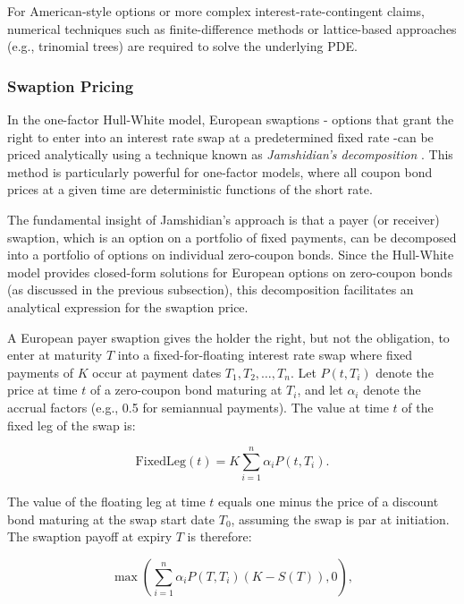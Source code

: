 For American-style options or more complex interest-rate-contingent claims, numerical techniques such as finite-difference methods or lattice-based approaches (e.g., trinomial trees) are required to solve the underlying PDE.

\subsubsection{Swaption Pricing} \label{swaption_pricing}
In the one-factor Hull-White model, European swaptions - options that grant the right to enter into an interest rate swap at a predetermined fixed rate -can be priced analytically using a technique known as \textit{Jamshidian’s decomposition} \parencite{jamshidian1989decomposition}. This method is particularly powerful for one-factor models, where all coupon bond prices at a given time are deterministic functions of the short rate.

The fundamental insight of Jamshidian’s approach is that a payer (or receiver) swaption, which is an option on a portfolio of fixed payments, can be decomposed into a portfolio of options on individual zero-coupon bonds. Since the Hull-White model provides closed-form solutions for European options on zero-coupon bonds (as discussed in the previous subsection), this decomposition facilitates an analytical expression for the swaption price.

A European payer swaption gives the holder the right, but not the obligation, to enter at maturity \( T \) into a fixed-for-floating interest rate swap where fixed payments of \( K \) occur at payment dates \( T_1, T_2, \dots, T_n \). Let \( P(t, T_i) \) denote the price at time \( t \) of a zero-coupon bond maturing at \( T_i \), and let \( \alpha_i \) denote the accrual factors (e.g., 0.5 for semiannual payments). The value at time \( t \) of the fixed leg of the swap is:

\begin{equation}
\text{FixedLeg}(t) = K \sum_{i=1}^n \alpha_i P(t, T_i).    
\end{equation}

The value of the floating leg at time \( t \) equals one minus the price of a discount bond maturing at the swap start date \( T_0 \), assuming the swap is par at initiation. The swaption payoff at expiry \( T \) is therefore:

\begin{equation}
\max\left( \sum_{i=1}^n \alpha_i P(T, T_i) (K - S(T)), 0 \right),
\end{equation}

